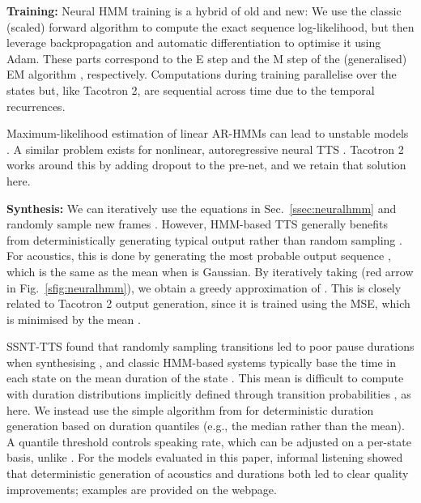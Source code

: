 \documentclass[british]{article}
\begin{document}
\textbf{Training:}
Neural HMM training \cite{tran2016unsupervised} is a hybrid of old and new:
We use the classic (scaled) forward algorithm \cite{rabiner1989tutorial} to compute the exact sequence log-likelihood, but then leverage backpropagation and automatic differentiation to optimise it using Adam.
These parts correspond to the E step and the M step of the (generalised) EM algorithm \cite{dempster1977maximum}, respectively.
Computations during training parallelise over the states but, like Tacotron 2, are sequential across time due to the temporal recurrences.

Maximum-likelihood estimation of linear AR-HMMs can lead to unstable models \cite{quillen2012autoregressive,shannon2013autoregressive}.
A similar problem exists for nonlinear, autoregressive neural TTS \cite{tan2021survey}.
Tacotron 2 works around this by adding dropout to the pre-net, and we retain that solution here.


\textbf{Synthesis:}
We can iteratively use the equations in Sec.\ \ref{ssec:neuralhmm}
and randomly sample new frames .
However, HMM-based TTS generally benefits from deterministically generating typical output rather than random sampling \cite{henter2014measuring,henter2016robust}.
For acoustics, this is done by generating the most probable output sequence \cite{tokuda2000speech}, which is the same as the mean  when  is Gaussian.
By iteratively taking  (red arrow in Fig.\ \ref{sfig:neuralhmm}), we obtain a greedy approximation of \cite{tokuda2000speech}.
This is closely related to Tacotron 2 output generation, since it is trained using the MSE, which is minimised by the mean .


SSNT-TTS found that randomly sampling transitions led to poor pause durations when synthesising \cite{yasuda2019initial}, and classic HMM-based systems typically base the time in each state on the mean duration of the state \cite{zen2004hidden}.
This mean is difficult to compute with duration distributions implicitly defined through transition probabilities , as here.
We instead use the simple algorithm from \cite{ronanki2016median,henter2017nonparametric} for deterministic duration generation based on duration quantiles (e.g., the median rather than the mean).
A quantile threshold controls speaking rate, which can be adjusted on a per-state basis, unlike \cite{bae2020speaking}.
For the models evaluated in this paper, informal listening showed that deterministic generation of acoustics and durations both led to clear quality improvements; examples are provided on the webpage.
\end{document}
